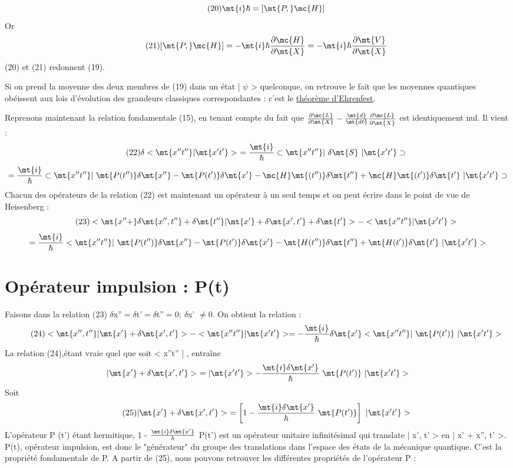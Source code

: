 \[
\tag{20}\mt{i}\hbar=[\mt{P, }\mc{H}]
\]
Or
\[
\tag{21}[\mt{P, }\mc{H}]=-\mt{i}\hbar\frac{\partial\mc{H}}{\partial\mt{X}}=
-\mt{i}\hbar\frac{\partial\mt{V}}{\partial\mt{X}}
\]
(20) et (21) redonnent (19).

Si on prend la moyenne des deux membres de (19) dans un état
| $\psi$ > quelconque, on retrouve le fait que les moyennes quantiques obéissent
aux lois d'évolution des grandeurs classiques correspondantes : c'est le
\ul{théorème d'Ehrenfest}.

Reprenons maintenant la relation fondamentale (15), en tenant
compte du fait que $\frac{\partial\mc{L}}{\partial\mt{X}}
-\frac{\mt{d}}{\mt{dt}}\frac{\partial\mc{L}}{\partial\dot{\mt{X}}}$ est identiquement nul. Il vient :
\[
\tag{22}\delta<\mt{ x''t'' }|\mt{ x't' }>\ =\frac{\mt{i}}{\hbar}\subset \mt{x''t'' }|\ \delta\mt{S}\ |\mt{ x't'}\supset
\]
\[
=\frac{\mt{i}}{\hbar}\subset \mt{x''t'' }|\ \mt{ P(t'')}\delta\mt{x''}-\mt{ P(t')}\delta\mt{x'}
-\mc{H}\mt{(t'')}\delta\mt{t''}+\mc{H}\mt{(t')}\delta\mt{t'}\ |\mt{ x't'}\supset
\]
Chacun des opérateurs de la relation (22) est maintenant un opérateur à
un seul temps et on peut écrire dans le point de vue de Heisenberg :
\[
\tag{23}<\mt{x''+}\delta \mt{x'', t''}+\delta \mt{t'' }|\mt{ x'}+\delta \mt{x', t'}+\delta \mt{t'}> - <\mt{ x''t'' }|\mt{ x't' }>
\]
\[
=\frac{\mt{i}}{\hbar}< \mt{x''t'' }|\ \mt{ P(t'')}\delta\mt{x''}-\mt{ P(t')}\delta\mt{x'}
-\mt{H(t'')}\delta\mt{t''}+\mt{H(t')}\delta\mt{t'}\ |\mt{ x't'}>
\]

\section{Opérateur impulsion : P(t)}%
Faisons dans la relation (23) $\delta$x''$= \delta$t'$= \delta$t''$= 0;\ \delta$x' $\neq 0$.
On obtient la relation :
\[
\tag{24}<\mt{x'', t'' }|\mt{ x'}+\delta \mt{x', t'}> - <\mt{ x''t'' }|\mt{ x't' }>=-\frac{\mt{i}}{\hbar}\delta\mt{x'}< \mt{x''t'' }|\ \mt{ P(t')}\ |\mt{ x't'}>
\]
La relation (24),étant vraie quel que soit < x''t'' | , entraîne
\[
|\mt{ x'}+\delta \mt{x', t'}>\ =|\mt{ x't' }>-\frac{\mt{i}\delta\mt{x'}}{\hbar}\ \mt{ P(t')}\ |\mt{ x't'}>
\]
Soit
\[
\tag{25}|\mt{ x'}+\delta \mt{x', t'}>\ =\left[1-\frac{\mt{i}\delta\mt{x'}}{\hbar}\ \mt{ P(t')}\right]\ |\mt{ x't'}>
\]
L'opérateur P (t') étant hermitique, 1 - $\frac{\mt{i}\delta\mt{x'}}{\hbar}$ P(t') est un
opérateur unitaire infinitésimal qui translate | x', t' > en | x' + x'', t' >.
P(t), opérateur impulsion, est donc le "générateur" du groupe des translations dans l'espace des états de la mécanique quantique. C'est la propriété
fondamentale de P. A partir de (25), nous pouvons retrouver les différentes
propriétés de l'opérateur P :


